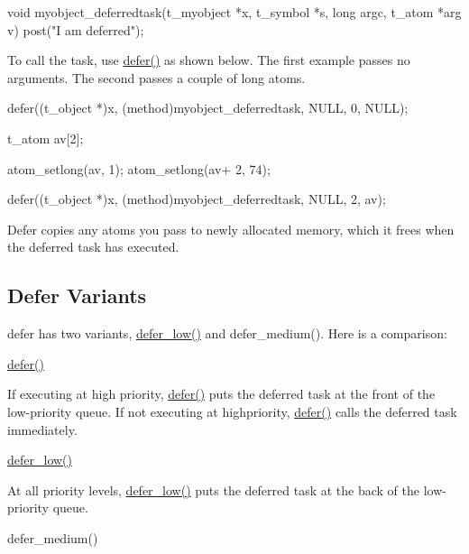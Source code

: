 \begin{DoxyCode}
    void myobject_deferredtask(t_myobject *x, t_symbol *s, long argc, t_atom *arg
      v)
    {
        post("I am deferred");
    }
\end{DoxyCode}


To call the task, use \hyperlink{group__threading_gaa24a0c9896f1ad241e45590065c3f643}{defer()} as shown below. The first example passes no arguments. The second passes a couple of long atoms. 
\begin{DoxyCode}
        defer((t_object *)x, (method)myobject_deferredtask, NULL, 0, NULL);

        t_atom av[2];

        atom_setlong(av, 1);
        atom_setlong(av+ 2, 74);

        defer((t_object *)x, (method)myobject_deferredtask, NULL, 2, av);
\end{DoxyCode}


Defer copies any atoms you pass to newly allocated memory, which it frees when the deferred task has executed.\hypertarget{chapter_scheduler_chapter_scheduler_defer_variants}{}\subsection{Defer Variants}\label{chapter_scheduler_chapter_scheduler_defer_variants}
defer has two variants, \hyperlink{group__threading_ga486daa40ddb16f70b663615695d18315}{defer\_\-low()} and defer\_\-medium(). Here is a comparison:

\hyperlink{group__threading_gaa24a0c9896f1ad241e45590065c3f643}{defer()}

If executing at high priority, \hyperlink{group__threading_gaa24a0c9896f1ad241e45590065c3f643}{defer()} puts the deferred task at the front of the low-\/priority queue. If not executing at highpriority, \hyperlink{group__threading_gaa24a0c9896f1ad241e45590065c3f643}{defer()} calls the deferred task immediately.

\hyperlink{group__threading_ga486daa40ddb16f70b663615695d18315}{defer\_\-low()}

At all priority levels, \hyperlink{group__threading_ga486daa40ddb16f70b663615695d18315}{defer\_\-low()} puts the deferred task at the back of the low-\/priority queue.

defer\_\-medium()

